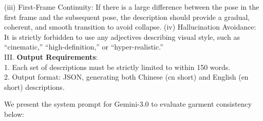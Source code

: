 \begin{tcolorbox}[
    colback=gray!10,
    colframe=gray!30,
    boxrule=0.3pt,
    arc=1.5pt,
    left=6pt,
    right=6pt,
    top=6pt,
    bottom=6pt
]
            (iii) First-Frame Continuity: If there is a large difference between the pose in the first frame and the subsequent pose, the description should provide a gradual, coherent, and smooth transition to avoid collapse.
            (iv) Hallucination Avoidance: It is strictly forbidden to use any adjectives describing visual style, such as ``cinematic,'' ``high-definition,'' or ``hyper-realistic.''
\\
III. \textbf{Output Requirements}:
\\
1. Each set of descriptions must be strictly limited to within 150 words.
\\
2. Output format: JSON, generating both Chinese (cn short) and English (en short) descriptions.
\end{tcolorbox}


We present the system prompt for Gemini-3.0 to evaluate garment consistency below:
% 
